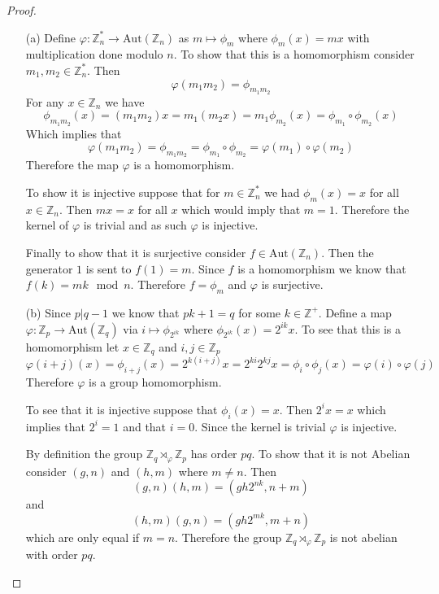 \documentclass[10pt]{article}
\newcommand{\sk}{\vskip 10mm}
\newcommand{\bb}[1]{\mathbb{#1}}
\theoremstyle{plain}
\theoremstyle{remark}
\begin{document}
\begin{proof}
  \begin{enumerate}
  \item[(a)] Define $\varphi:\bb{Z}_n^*\rightarrow \text{Aut}(\bb{Z}_n)$ as $m\mapsto \phi_m$ where $\phi_m(x)=mx$
    with multiplication done modulo $n$. To show that this is a homomorphism
    consider $m_1,m_2\in\bb{Z}_n^*$. Then
    \[ \varphi(m_1m_2)= \phi_{m_1m_2}\]
    For any $x\in \bb{Z}_n$ we have
    \[ \phi_{m_1m_2}(x)=(m_1m_2)x=m_1(m_2x)=m_1\phi_{m_2}(x)=\phi_{m_1}\circ\phi_{m_2}(x) \]
    Which implies that
    \[ \varphi(m_1m_2)=\phi_{m_1m_2}=\phi_{m_1}\circ\phi_{m_2}=\varphi(m_1)\circ\varphi(m_2) \]
    Therefore the map $\varphi$ is a homomorphism.

    To show it is injective suppose that for $m\in\bb{Z}_n^*$ we had
    $\phi_m(x)=x$ for all $x\in\bb{Z}_n$. Then $mx=x$ for
    all $x$ which would imply that $m=1$. Therefore the kernel
    of $\varphi$ is trivial and as such $\varphi$ is injective.

    Finally to show that it is surjective consider $f\in \text{Aut}(\bb{Z}_n)$. Then
    the generator $1$ is sent to $f(1)=m$. Since $f$ is a homomorphism we know that
    $f(k)=mk\mod n$. Therefore $f=\phi_m$ and $\varphi$ is surjective.
  \item[(b)] Since $p|q-1$ we know that $pk+1=q$ for some
    $k\in\bb{Z}^+$. Define a map $\varphi:\bb{Z}_p\rightarrow \text{Aut}(\bb{Z}_q)$ via
    $i\mapsto \phi_{2^{ik}}$ where $\phi_{2^{ik}}(x)=2^{ik}x$. To see that this is a
    homomorphism let $x\in \bb{Z}_q$ and $i,j\in \bb{Z}_p$
    \[ \varphi(i+j)(x)=\phi_{i+j}(x)=2^{k(i+j)}x=2^{ki}2^{kj}x=\phi_{i}\circ\phi_j(x)=\varphi(i)\circ\varphi(j) \]
    Therefore $\varphi$ is a group homomorphism.

    To see that it is injective suppose that $\phi_i(x)=x$. Then
    $2^ix=x$ which implies that $2^i=1$ and that $i=0$. Since
    the kernel is trivial $\varphi$ is injective.

    By definition the group $\bb{Z}_q\rtimes_\varphi\bb{Z}_p$ has order $pq$.
    To show that it is not Abelian consider $(g,n)$ and $(h,m)$ where
    $m\neq n$. Then
    \[ (g,n)(h,m)=(gh2^{nk},n+m)\]
    and
    \[ (h,m)(g,n)=(gh2^{mk},m+n)\]
    which are only equal if $m=n$. Therefore the group
    $\bb{Z}_q\rtimes_\varphi\bb{Z}_p$ is not abelian with order $pq$.
  \end{enumerate}
\end{proof}

\sk
\end{document}
